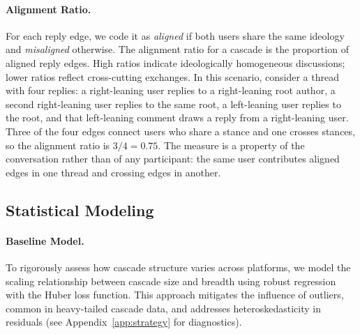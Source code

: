 \documentclass[letterpaper]{article} %
\newcommand{\cb}[1]{\textcolor{blue}{CB: #1}}
\newcommand{\rev}[1]{{\color{blue}#1}}
\begin{document}

\paragraph*{Alignment Ratio.}
For each reply edge, we code it as \textit{aligned} if both users share the same ideology and \textit{misaligned} otherwise. The alignment ratio for a cascade is the proportion of aligned reply edges. High ratios indicate ideologically homogeneous discussions; lower ratios reflect cross-cutting exchanges. \rev{In this scenario, consider a thread with four replies: a right-leaning user replies to a right-leaning root author, a second right-leaning user replies to the same root, a left-leaning user replies to the root, and that left-leaning comment draws a reply from a right-leaning user. Three of the four edges connect users who share a stance and one crosses stances, so the alignment ratio is $3/4 = 0.75$. The measure is a property of the conversation rather than of any participant: the same user contributes aligned edges in one thread and crossing edges in another.} 

\subsection{Statistical Modeling}

\paragraph*{Baseline Model.}
To rigorously assess how cascade structure varies across platforms, we model the scaling relationship between cascade size and breadth using robust regression with the Huber loss function. This approach mitigates the influence of outliers, common in heavy-tailed cascade data, and addresses heteroskedasticity in residuals (see Appendix~\ref{app:strategy} for diagnostics).
\end{document}
